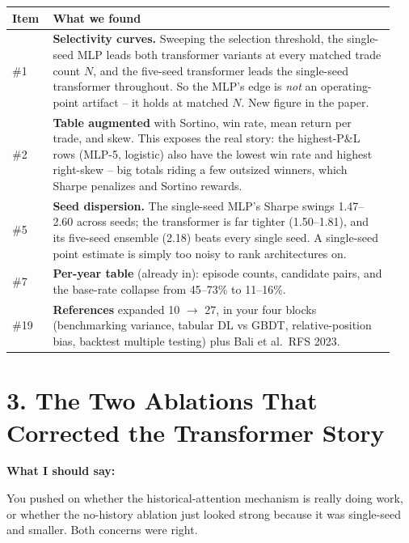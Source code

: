 \documentclass[11pt]{article}
\begin{document}
\begin{center}
\begin{tabular}{p{0.10\linewidth}p{0.84\linewidth}}
\toprule
Item & What we found \\
\midrule
\#1 & \textbf{Selectivity curves.} Sweeping the selection threshold, the single-seed MLP leads both transformer variants at every matched trade count $N$, and the five-seed transformer leads the single-seed transformer throughout. So the MLP's edge is \emph{not} an operating-point artifact -- it holds at matched $N$. New figure in the paper. \\
\#2 & \textbf{Table augmented} with Sortino, win rate, mean return per trade, and skew. This exposes the real story: the highest-P\&L rows (MLP-5, logistic) also have the lowest win rate and highest right-skew -- big totals riding a few outsized winners, which Sharpe penalizes and Sortino rewards. \\
\#5 & \textbf{Seed dispersion.} The single-seed MLP's Sharpe swings 1.47--2.60 across seeds; the transformer is far tighter (1.50--1.81), and its five-seed ensemble (2.18) beats every single seed. A single-seed point estimate is simply too noisy to rank architectures on. \\
\#7 & \textbf{Per-year table} (already in): episode counts, candidate pairs, and the base-rate collapse from 45--73\% to 11--16\%. \\
\#19 & \textbf{References} expanded 10 $\to$ 27, in your four blocks (benchmarking variance, tabular DL vs GBDT, relative-position bias, backtest multiple testing) plus Bali et al.\ RFS 2023. \\
\bottomrule
\end{tabular}
\end{center}

\section*{3. The Two Ablations That Corrected the Transformer Story}
\textbf{What I should say:}

You pushed on whether the historical-attention mechanism is really doing work, or whether the no-history ablation just looked strong because it was single-seed and smaller. Both concerns were right.
\end{document}
